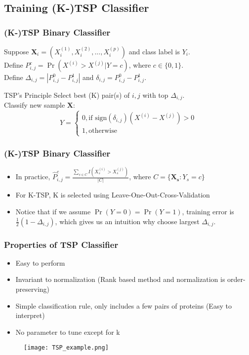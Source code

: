 \documentclass{beamer}
\begin{document}
\subsection{Training (K-)TSP Classifier}
\begin{frame}[fragile]
\frametitle{(K-)TSP Binary Classifier \cite{geman2004classifying}\cite{tan2005simple}}
Suppose $\mathbf{X}_i = (X_i^{(1)}, X_i^{(2)}, ..., X_i^{(p)})$ and class label is $Y_i$.\\
Define $P^c_{i,j} = \Pr(X^{(i)} > X^{(j)}|Y = c)$, where $c \in \{0, 1\}$.\\
Define $\Delta_{i, j} = |P^0_{i, j} - P^1_{i, j}|$ and $\delta_{i, j} = P^0_{i, j} - P^1_{i, j}$.
\begin{exampleblock}{TSP's Principle}
Select best (K) pair(s) of $i, j$ with top $\Delta_{i, j}$.\\
Classify new sample $\mathbf{X}$:
	\[
	Y = 
	\begin{cases}
	0, \text{if } \text{sign}(\delta_{i, j})(X^{(i)} - X^{(j)}) > 0\\
	1, \text{otherwise} 
	\end{cases}
	\]
\end{exampleblock}
\end{frame}

\begin{frame}
\frametitle{(K-)TSP Binary Classifier \cite{geman2004classifying}\cite{tan2005simple}}
\begin{itemize}
\item In practice, $\hat{P}^c_{i, j} = \frac{\sum\limits_{s \in C} I(X_s^{(i)} > X_s^{(j)})}{|C|}$, where $C = \{\mathbf{X_s}: Y_s = c\}$
\item For K-TSP, K is selected using Leave-One-Out-Cross-Validation
\item Notice that if we assume $\Pr(Y = 0) = \Pr(Y = 1)$, training error is $\frac{1}{2}(1 - \Delta_{i, j})$, which gives us an intuition why choose largest $\Delta_{i, j}$.
\end{itemize}
\end{frame}

\begin{frame}
\frametitle{Properties of TSP Classifier}
\begin{itemize}
\item Easy to perform  
\item Invariant to normalization (Rank based method and normalization is order-preserving)
\item Simple classification rule, only includes a few pairs of proteins (Easy to interpret)
\item No parameter to tune except for k
\end{itemize}
\begin{figure}
  \texttt{[image: TSP\_example.png]}
  \cite{geman2004classifying}
\end{figure}
\end{frame}
\end{document}
